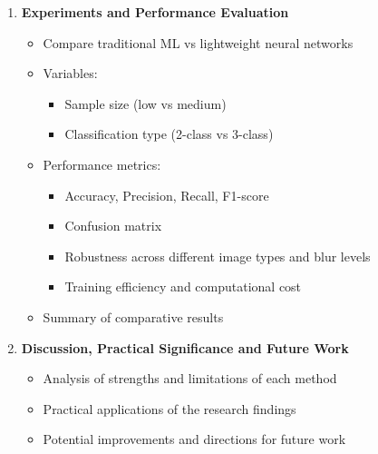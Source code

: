 \begin{enumerate}
      \item \textbf{Experiments and Performance Evaluation}
            \begin{itemize}
                  \item Compare traditional ML vs lightweight neural networks
                  \item Variables:
                        \begin{itemize}
                              \item Sample size (low vs medium)
                              \item Classification type (2-class vs 3-class)
                        \end{itemize}
                  \item Performance metrics:
                        \begin{itemize}
                              \item Accuracy, Precision, Recall, F1-score
                              \item Confusion matrix
                              \item Robustness across different image types and blur levels
                              \item Training efficiency and computational cost
                        \end{itemize}
                  \item Summary of comparative results
            \end{itemize}

      \item \textbf{Discussion, Practical Significance and Future Work}
            \begin{itemize}
                  \item Analysis of strengths and limitations of each method
                  \item Practical applications of the research findings
                  \item Potential improvements and directions for future work
            \end{itemize}

\end{enumerate}

